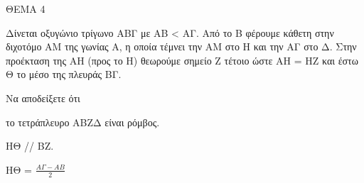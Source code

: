 
ΘΕΜΑ 4

Δίνεται οξυγώνιο τρίγωνο ΑΒΓ με ΑΒ \textless{} ΑΓ. Από το Β φέρουμε κάθετη στην διχοτόμο ΑΜ της γωνίας Α, η οποία τέμνει την ΑΜ στο Η και την ΑΓ στο Δ. Στην προέκταση της ΑΗ (προς το Η) θεωρούμε σημείο Ζ τέτοιο ώστε ΑΗ = ΗΖ και έστω Θ το μέσο της πλευράς ΒΓ.

Να αποδείξετε ότι

\begin{alist}
\item το τετράπλευρο ΑΒΖΔ είναι ρόμβος. 

\item ΗΘ // ΒΖ. 

\item ΗΘ = $\frac{Α\Gamma - ΑΒ}{2}$ 


\end{alist}
